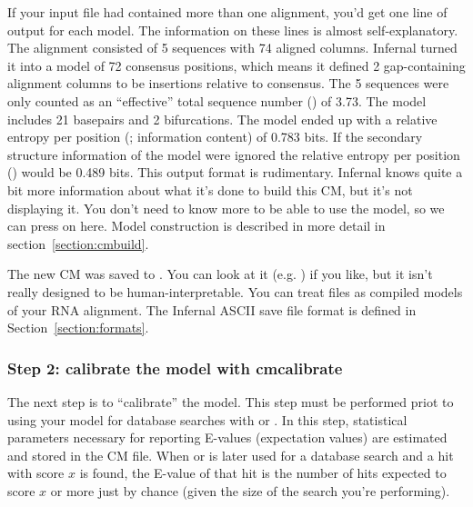 If your input file had contained more than one alignment, you'd get
one line of output for each model. The information on these lines is
almost self-explanatory. The  alignment consisted of 5
sequences with 74 aligned columns. Infernal turned it into a model of
72 consensus positions, which means it defined 2 gap-containing
alignment columns to be insertions relative to consensus. The 5
sequences were only counted as an ``effective'' total sequence number
() of 3.73. The model includes 21 basepairs and 2
bifurcations. The model ended up with a relative entropy per position
(; information content) of 0.783 bits. If the
secondary structure information of the model were ignored the relative
entropy per position () would be 0.489 bits.
This output format is rudimentary. Infernal knows quite a bit more
information about what it's done to build this CM, but it's not
displaying it. You don't need to know more to be able to use the
model, so we can press on here. Model construction is described in
more detail in section~\ref{section:cmbuild}.

The new CM was saved to . You can look at it
(e.g. ) if you like, but it isn't really designed
to be human-interpretable. You can treat  files as compiled
models of your RNA alignment. The Infernal ASCII save file format is
defined in Section~\ref{section:formats}.

\subsubsection{Step 2: calibrate the model with cmcalibrate}

The next step is to ``calibrate'' the model. This step must be
performed priot to using your model for database searches with
 or . In this step, statistical parameters
necessary for reporting E-values (expectation values) are estimated
and stored in the CM file. When  or  is
later used for a database search and a hit with score $x$ is found,
the E-value of that hit is the number of hits expected to score $x$ or
more just by chance (given the size of the search you're performing).

